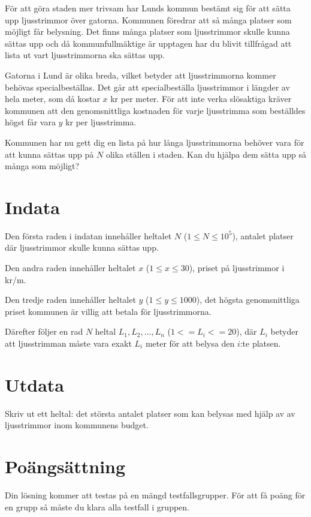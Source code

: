 För att göra staden mer trivsam har Lunds kommun bestämt sig för att sätta upp ljusstrimmor över gatorna.
Kommunen föredrar att så många platser som möjligt får belysning.
Det finns många platser som ljusstrimmor skulle kunna sättas upp och då kommunfullmäktige är upptagen
har du blivit tillfrågad att lista ut vart ljusstrimmorna ska sättas upp.



Gatorna i Lund är olika breda, vilket betyder att ljusstrimmorna kommer behövas specialbeställas.
Det går att specialbeställa ljusstrimmor i längder av hela meter, som då kostar $x$ kr per meter.
För att inte verka slösaktiga kräver kommunen att den genomsnittliga kostnaden för varje ljusstrimma
som beställdes högst får vara $y$ kr per ljusstrimma.

Kommunen har nu gett dig en lista på hur långa ljusstrimmorna behöver vara för att kunna sättas upp
på $N$ olika ställen i staden. Kan du hjälpa dem sätta upp så många som möjligt?

\section*{Indata}
Den första raden i indatan innehåller heltalet $N$ ($1 \leq N \leq 10^5$), antalet platser där ljusstrimmor skulle kunna sättas upp.

Den andra raden innehåller heltalet  $x$ ($1 \leq x \leq 30$), priset på ljusstrimmor i kr/m.

Den tredje raden innehåller heltalet $y$ ($1 \leq y \leq 1000$), det högsta genomsnittliga priset kommunen är villig att betala för ljusstrimmorna.

Därefter följer en rad $N$ heltal $L_1, L_2, \dots, L_n$ ($1<=L_i<=20$), där $L_i$ betyder att ljusstrimman måste vara exakt $L_i$ meter för att belysa den $i$:te platsen.

\section*{Utdata}
Skriv ut ett heltal: det största antalet platser som kan belysas med hjälp av av ljusstrimmor inom kommunens budget.


\section*{Poängsättning}
Din lösning kommer att testas på en mängd testfallsgrupper.
För att få poäng för en grupp så måste du klara alla testfall i gruppen.

